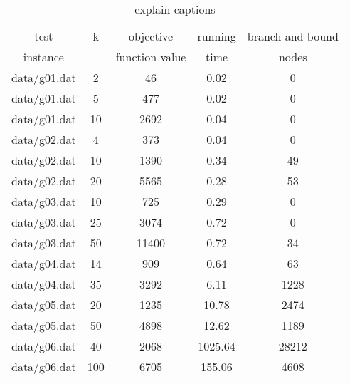 \begin{table} 
\small
\centering
\begin{tabular}{ccccc}
\hline
test     & k & objective      & running & branch-and-bound \\
instance &   & function value & time    & nodes \\
\hline
data/g01.dat		&2	&46	&0.02	&0	\\ 
data/g01.dat		&5	&477	&0.02	&0	\\ 
data/g01.dat		&10	&2692	&0.04	&0	\\ 
data/g02.dat		&4	&373	&0.04	&0	\\ 
data/g02.dat		&10	&1390	&0.34	&49	\\ 
data/g02.dat		&20	&5565	&0.28	&53	\\ 
data/g03.dat		&10	&725	&0.29	&0	\\ 
data/g03.dat		&25	&3074	&0.72	&0	\\ 
data/g03.dat		&50	&11400	&0.72	&34	\\ 
data/g04.dat		&14	&909	&0.64	&63	\\ 
data/g04.dat		&35	&3292	&6.11	&1228	\\ 
data/g05.dat		&20	&1235	&10.78	&2474	\\ 
data/g05.dat		&50	&4898	&12.62	&1189	\\ 
data/g06.dat		&40	&2068	&1025.64	&28212	\\ 
data/g06.dat		&100	&6705	&155.06	&4608	\\

\hline
\end{tabular}
\caption{explain captions}
\label{tbl:scf_fast}
\end{table}
